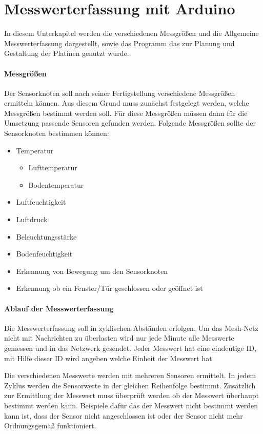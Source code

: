 \section{Messwerterfassung mit Arduino}
\label{sec:MesswerterfassungArduino}
In diesem Unterkapitel werden die verschiedenen Messgrößen und die Allgemeine Messwerterfassung dargestellt, sowie das Programm das zur Planung und Gestaltung der Platinen genutzt wurde.
\paragraph{Messgrößen} Der Sensorknoten soll nach seiner Fertigstellung verschiedene Messgrößen ermitteln können. Aus diesem Grund muss zunächst festgelegt werden, welche Messgrößen bestimmt werden soll. Für diese Messgrößen müssen dann für die Umsetzung passende Sensoren gefunden werden. Folgende Messgrößen sollte der Sensorknoten bestimmen können:
\begin{itemize}
	\item Temperatur
	\begin{itemize}
		\item Lufttemperatur
		\item Bodentemperatur 
	\end{itemize}
	\item Luftfeuchtigkeit
	\item Luftdruck
	\item Beleuchtungsstärke
	\item Bodenfeuchtigkeit
	\item Erkennung von Bewegung um den Sensorknoten
	\item Erkennung ob ein Fenster/Tür geschlossen oder geöffnet ist
\end{itemize}
\paragraph{Ablauf der Messwerterfassung} Die Messwerterfassung soll in zyklischen Abständen erfolgen. Um das Mesh-Netz nicht mit Nachrichten zu überlasten wird nur jede Minute alle Messwerte gemessen und in das Netzwerk gesendet.  Jeder Messwert hat eine eindeutige ID, mit Hilfe dieser ID wird angeben welche Einheit der Messwert hat. 

Die verschiedenen Messwerte werden mit mehreren Sensoren ermittelt. In jedem Zyklus werden die Sensorwerte in der gleichen Reihenfolge bestimmt. Zusätzlich zur Ermittlung der Messwert muss überprüft werden ob der Messwert überhaupt bestimmt werden kann. Beispiele dafür das der Messwert nicht bestimmt werden kann ist, dass der Sensor nicht angeschlossen ist oder der Sensor nicht mehr Ordnungsgemäß funktioniert. 

